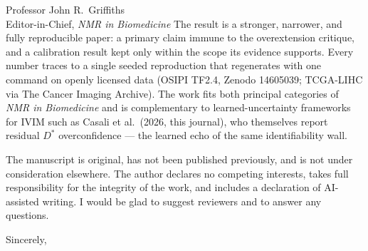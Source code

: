 \documentclass[11pt]{letter}
\begin{document}
\begin{letter}{Professor John R.\ Griffiths \\ Editor-in-Chief, \textit{NMR in Biomedicine}}
The result is a stronger, narrower, and fully reproducible paper: a primary claim
immune to the overextension critique, and a calibration result kept only within the
scope its evidence supports. Every number traces to a single seeded reproduction
that regenerates with one command on openly licensed data (OSIPI TF2.4, Zenodo
14605039; TCGA-LIHC via The Cancer Imaging Archive). The work fits both principal
categories of \textit{NMR in Biomedicine} and is complementary to learned-uncertainty
frameworks for IVIM such as Casali et al.\ (2026, this journal), who themselves
report residual $D^{*}$ overconfidence --- the learned echo of the same
identifiability wall.

The manuscript is original, has not been published previously, and is not under
consideration elsewhere. The author declares no competing interests, takes full
responsibility for the integrity of the work, and includes a declaration of
AI-assisted writing. I would be glad to suggest reviewers and to answer any
questions.

\closing{Sincerely,}
\end{letter}
\end{document}
